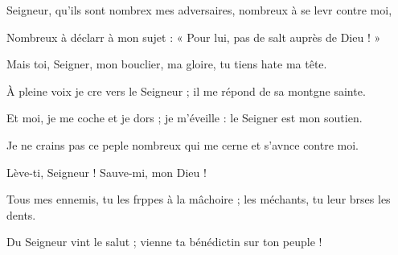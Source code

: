 \item Seigneur, qu’ils sont nombrex mes adversaires,\psstar{} nombreux à se levr contre moi,
\item Nombreux à déclarr à mon sujet :\psstar{} « Pour lui, pas de salt auprès de Dieu ! »
\item Mais toi, Seigner, mon bouclier,\psstar{} ma gloire, tu tiens hate ma tête.
\item À pleine voix je cre vers le Seigneur ;\psstar{} il me répond de sa montgne sainte.
\item Et moi, je me coche et je dors ;\psstar{} je m’éveille : le Seigner est mon soutien.
\item Je ne crains pas ce peple nombreux\psstar{} qui me cerne et s’avnce contre moi.
\item Lève-ti, Seigneur !\psstar{} Sauve-mi, mon Dieu !
\item Tous mes ennemis, tu les frppes à la mâchoire ;\psstar{} les méchants, tu leur brses les dents.
\item Du Seigneur vint le salut ;\psstar{} vienne ta bénédictin sur ton peuple !